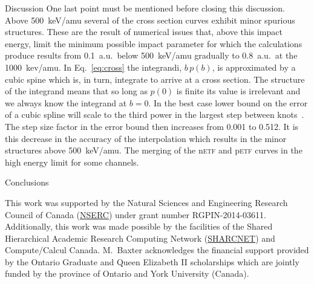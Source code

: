 \documentclass[aps, pra, reprint, groupedaddress, amsfonts,
               amsmath, amssymb, showpacs, nofootinbib]{revtex4-1}
\begin{document}
\begin{section}{Discussion \label{sec:disc}}
   One last point must be mentioned before closing this discussion. Above 500~keV/amu several of the cross
   section curves exhibit minor spurious structures. These are the result of numerical issues that, above
   this impact energy, limit the minimum possible impact parameter for which the calculations produce
   results from 0.1~a.u.\ below 500~keV/amu gradually to 0.8~a.u.\ at the 1000~kev/amu. In
   Eq.~\eqref{eq:cross} the integrandi, $b \, p(b)$, is approximated by a cubic spine which is, in turn,
   integrate to arrive at a cross section. The structure of the integrand means that so long as $p(0)$ is
   finite its value is irrelevant and we always know the integrand at $b = 0$. In the best case lower bound
   on the error of a cubic spline will scale to the third power in the largest step between
   knots~\cite{spline-err}. The step size factor in the error bound then increases from 0.001 to 0.512.
   It is this decrease in the accuracy of the interpolation which results in the minor structures above
   500~keV/amu. The merging of the n\textsc{etf} and p\textsc{etf} curves in the high energy limit for some
   channels.

\end{section}

\begin{section}{Conclusions \label{sec:conc}}
\end{section}

\begin{acknowledgments}

   This work was supported by the Natural Sciences and Engineering Research Council
   of Canada (\href{http://www.nserc-crsng.gc.ca/}{NSERC}) under grant number RGPIN-2014-03611.
   Additionally, this work was made possible by the facilities of the Shared Hierarchical Academic
   Research Computing Network (\href{www.sharcnet.ca}{SHARCNET}) and Compute/Calcul Canada. M.\ Baxter
   acknowledges the financial support provided by the Ontario Graduate and Queen Elizabeth II scholarships
   which are jointly funded by the province of Ontario and York University (Canada).

\end{acknowledgments}


\end{document}
